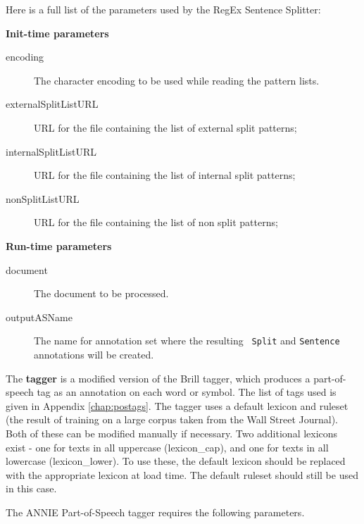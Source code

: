 Here is a full list of the parameters used by the RegEx Sentence Splitter:

{\bf Init-time parameters}
\begin{description}
\item[encoding] The character encoding to be used while reading the pattern 
lists.
\item[externalSplitListURL] URL for the file containing the list of external
split patterns;
\item[internalSplitListURL] URL for the file containing the list of internal
split patterns;
\item[nonSplitListURL] URL for the file containing the list of non split
patterns;
\end{description}

{\bf Run-time parameters}
\begin{description}
\item[document] The document to be processed.
\item[outputASName] The name for annotation set where the resulting {\tt
Split} and {\tt Sentence} annotations will be created.
\end{description}

The \textbf{tagger} \cite{Hepple00} is a modified version of the Brill tagger,
which produces a part-of-speech tag as an annotation on each word or symbol.
The list of tags used is given in Appendix \ref{chap:postags}. The tagger uses
a default lexicon and ruleset (the result of training on a large corpus taken
from the Wall Street Journal). Both of these can be modified manually if
necessary. Two additional lexicons exist - one for texts in all uppercase
(lexicon\_cap), and one for texts in all lowercase (lexicon\_lower). To use
these, the default lexicon should be replaced with the appropriate lexicon at
load time. The default ruleset should still be used in this case. 

The ANNIE Part-of-Speech tagger requires the following parameters.
 
